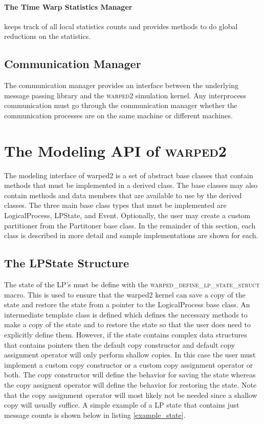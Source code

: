 \documentclass[11pt]{book}
\begin{document}
\paragraph{The Time Warp Statistics Manager} keeps track of all local statistics counts and
provides methods to do global reductions on the statistics.

\subsection{Communication Manager}

The communication manager provides an interface between the underlying message passing library
and the \textsc{warped2} simulation kernel. Any interprocess communication must go through the
communication manager whether the communication processes are on the same machine or different
machines.

\section{The Modeling API of \textsc{warped2}}

The modeling interface of warped2 is a set of abstract base classes that contain methods
that must be implemented in a derived class. The base classes may also contain methods and
data members that are available to use by the derived classes. The three main base class
types that must be implemented are LogicalProcess, LPState, and Event. Optionally, the user
may create a custom partitioner from the Partitoner base class. In the remainder of this
section, each class is described in more detail and sample implementations are shown for each.

\subsection{The LPState Structure}

The state of the LP's must be define with the \textsc{warped\_define\_lp\_state\_struct}
macro. This is used to ensure that the warped2 kernel can save a copy of the state and
restore the state from a pointer to the LogicalProcess base class. An intermediate template
class is defined which defines the necessary methods to make a copy of the state and to
restore the state so that the user does need to explicitly define them. However, if the
state contains complex data structures that contains pointers then the default copy
constructor and default copy assignment operator will only perform shallow copies. In this
case the user must implement a custom copy constructor or a custom copy assignment operator
or both. The copy constructor will define the behavior for saving the state whereas the
copy assignent operator will define the behavior for restoring the state. Note that the
copy assignment operator will most likely not be needed since a shallow copy will usually
suffice. A simple example of a LP state that contains just message counts is shown
below in listing \ref{example_state}.
\end{document}
